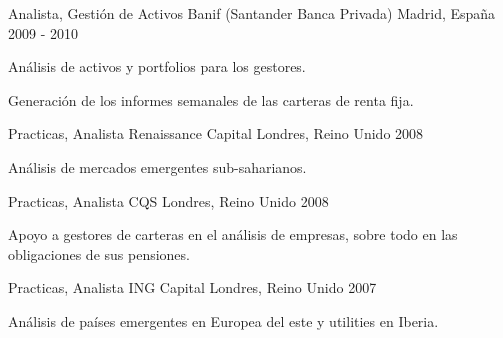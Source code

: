 \begin{cventries}
\cventry
    {Analista, Gestión de Activos} %
    {Banif (Santander Banca Privada)} %
    {Madrid, España} %
    {2009 - 2010} %
    {
        \begin{cvitems} %
            \item {Análisis de activos y portfolios para los gestores.}
            \item {Generación de los informes semanales de las carteras de renta fija.}
        \end{cvitems}
    }

\cventry
    {Practicas, Analista} %
    {Renaissance Capital} %
    {Londres, Reino Unido} %
    {2008} %
    {
        \begin{cvitems} %
            \item {Análisis de mercados emergentes sub-saharianos.}
        \end{cvitems}
    }

\cventry
    {Practicas, Analista} %
    {CQS} %
    {Londres, Reino Unido} %
    {2008} %
    {
        \begin{cvitems} %
            \item {Apoyo a gestores de carteras en el análisis de empresas, sobre todo en las obligaciones de sus pensiones.}
        \end{cvitems}
    }

\cventry
    {Practicas, Analista} %
    {ING Capital} %
    {Londres, Reino Unido} %
    {2007} %
    {
        \begin{cvitems} %
            \item {Análisis de países emergentes en Europea del este y utilities en Iberia.}
        \end{cvitems}
    }

\end{cventries}

